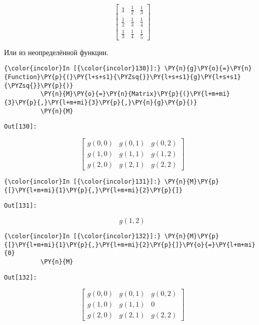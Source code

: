     \[\left[\begin{matrix}1 & \frac{1}{2} & \frac{1}{3}\\\frac{1}{2} & \frac{1}{3} & \frac{1}{4}\\\frac{1}{3} & \frac{1}{4} & \frac{1}{5}\end{matrix}\right]\]

    

    Или из неопределённой функции.

    \begin{Verbatim}[commandchars=\\\{\}]
{\color{incolor}In [{\color{incolor}130}]:} \PY{n}{g}\PY{o}{=}\PY{n}{Function}\PY{p}{(}\PY{l+s+s1}{\PYZsq{}}\PY{l+s+s1}{g}\PY{l+s+s1}{\PYZsq{}}\PY{p}{)}
          \PY{n}{M}\PY{o}{=}\PY{n}{Matrix}\PY{p}{(}\PY{l+m+mi}{3}\PY{p}{,}\PY{l+m+mi}{3}\PY{p}{,}\PY{n}{g}\PY{p}{)}
          \PY{n}{M}
\end{Verbatim}
\texttt{\color{outcolor}Out[{\color{outcolor}130}]:}
    
    \[\left[\begin{matrix}g{\left (0,0 \right )} & g{\left (0,1 \right )} & g{\left (0,2 \right )}\\g{\left (1,0 \right )} & g{\left (1,1 \right )} & g{\left (1,2 \right )}\\g{\left (2,0 \right )} & g{\left (2,1 \right )} & g{\left (2,2 \right )}\end{matrix}\right]\]

    

    \begin{Verbatim}[commandchars=\\\{\}]
{\color{incolor}In [{\color{incolor}131}]:} \PY{n}{M}\PY{p}{[}\PY{l+m+mi}{1}\PY{p}{,}\PY{l+m+mi}{2}\PY{p}{]}
\end{Verbatim}
\texttt{\color{outcolor}Out[{\color{outcolor}131}]:}
    
    \[g{\left (1,2 \right )}\]

    

    \begin{Verbatim}[commandchars=\\\{\}]
{\color{incolor}In [{\color{incolor}132}]:} \PY{n}{M}\PY{p}{[}\PY{l+m+mi}{1}\PY{p}{,}\PY{l+m+mi}{2}\PY{p}{]}\PY{o}{=}\PY{l+m+mi}{0}
          \PY{n}{M}
\end{Verbatim}
\texttt{\color{outcolor}Out[{\color{outcolor}132}]:}
    
    \[\left[\begin{matrix}g{\left (0,0 \right )} & g{\left (0,1 \right )} & g{\left (0,2 \right )}\\g{\left (1,0 \right )} & g{\left (1,1 \right )} & 0\\g{\left (2,0 \right )} & g{\left (2,1 \right )} & g{\left (2,2 \right )}\end{matrix}\right]\]

